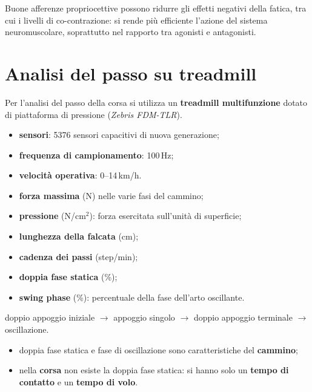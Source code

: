 Buone afferenze propriocettive possono ridurre gli effetti negativi della fatica, tra cui
i livelli di co-contrazione: si rende più efficiente l'azione del sistema neuromuscolare,
soprattutto nel rapporto tra agonisti e antagonisti.

\section{Analisi del passo su treadmill}

Per l'analisi del passo della corsa si utilizza un \textbf{treadmill multifunzione} dotato di
piattaforma di pressione (\textit{Zebris FDM-TLR}).

\begin{itemize}
  \item \textbf{sensori}: 5376 sensori capacitivi di nuova generazione;
  \item \textbf{frequenza di campionamento}: 100\,Hz;
  \item \textbf{velocità operativa}: 0--14\,km/h.
\end{itemize}

\begin{itemize}
  \item \textbf{forza massima} (N) nelle varie fasi del cammino;
  \item \textbf{pressione} (N/cm$^2$): forza esercitata sull'unità di superficie;
  \item \textbf{lunghezza della falcata} (cm);
  \item \textbf{cadenza dei passi} (step/min);
  \item \textbf{doppia fase statica} (\%);
  \item \textbf{swing phase} (\%): percentuale della fase dell'arto oscillante.
\end{itemize}

doppio appoggio iniziale $\rightarrow$ appoggio singolo $\rightarrow$ doppio appoggio terminale
$\rightarrow$ oscillazione.
\begin{itemize}
  \item doppia fase statica e fase di oscillazione sono caratteristiche del \textbf{cammino};
  \item nella \textbf{corsa} non esiste la doppia fase statica: si hanno solo un \textbf{tempo di
    contatto} e un \textbf{tempo di volo}.
\end{itemize}

